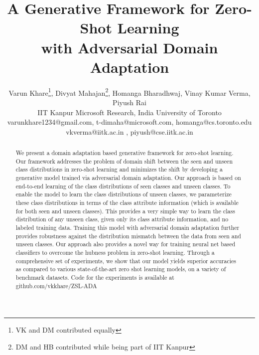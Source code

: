 \documentclass[10pt,twocolumn,letterpaper]{article}
\def\httilde{\mbox{\tt\raisebox{-.5ex}{\symbol{126}}}}
\begin{document}
\title{A Generative Framework for Zero-Shot Learning  \\ with Adversarial Domain Adaptation}

\author{
Varun Khare\thanks{VK and DM contributed equally}, 
Divyat Mahajan\footnotemark[1] \thanks{DM and HB contributed while being part of IIT Kanpur}, 
Homanga Bharadhwaj\footnotemark[2], 
Vinay Kumar Verma,
Piyush Rai 
\\  
IIT Kanpur 
Microsoft Research, India 
University of Toronto  \\
varunkhare1234@gmail.com, t-dimaha@microsoft.com, homanga@cs.toronto.edu \\ 
vkverma@iitk.ac.in , piyush@cse.iitk.ac.in}
\maketitle

\ifwacvfinal\thispagestyle{empty}\fi


\def\httilde{\mbox{\tt\raisebox{-.5ex}{\symbol{126}}}}





\begin{abstract}
  We present a domain adaptation based generative framework for zero-shot
 learning. Our framework addresses the problem of domain shift between the seen and unseen class distributions in zero-shot learning and minimizes the shift by developing a generative model trained via adversarial domain adaptation. Our approach is based on end-to-end learning of the class distributions of seen classes and unseen classes. To enable the model to learn the class distributions of unseen classes, we parameterize these class distributions in terms of the class attribute information (which is available for both seen and unseen classes). This provides a very simple way to learn the class distribution of any unseen class, given only its class attribute information, and no labeled training data. Training this model with adversarial domain adaptation further provides robustness against the distribution mismatch between the data from seen and unseen classes. Our approach also provides a novel way for training neural net based classifiers to overcome the hubness problem in zero-shot learning. Through a comprehensive set of experiments, we show that our model yields superior accuracies as compared to various state-of-the-art zero shot learning models, on a variety of benchmark datasets. Code for the experiments is available at github.com/vkkhare/ZSL-ADA
\end{abstract}
\end{document}
